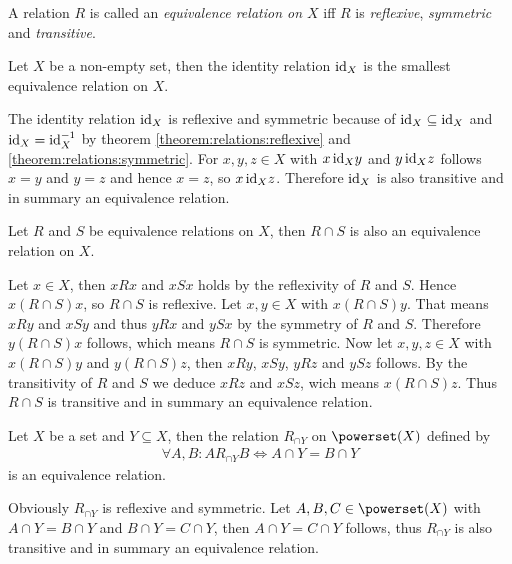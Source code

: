 \begin{definition}
    A relation $R$ is called an \emph{equivalence relation on $X$} iff $R$ is \emph{reflexive}, \emph{symmetric} and \emph{transitive}.
\end{definition}

\begin{examples}
    \begin{exampleenumerate}
        \item\label{example:relations:identity_relation_equivalence_relation} Let $X$ be a non-empty set, then the identity relation $\text{id}_X$ is the smallest equivalence relation on $X$.
        \begin{miniproof}
            The identity relation $\text{id}_X$ is reflexive and symmetric because of $\text{id}_X\subseteq\text{id}_X$ and $\text{id}_X=\text{id}_X^{-1}$ by theorem \ref{theorem:relations:reflexive} and \ref{theorem:relations:symmetric}. For $x,y,z\in X$ with $x\,\text{id}_X y$ and $y\,\text{id}_X z$ follows $x=y$ and $y=z$ and hence $x=z$, so $x\,\text{id}_X z$. Therefore $\text{id}_X$ is also transitive and in summary an equivalence relation.
        \end{miniproof}
        \item Let $R$ and $S$ be equivalence relations on $X$, then $R\cap S$ is also an equivalence relation on $X$.
        \begin{miniproof}
            Let $x\in X$, then $x R x$ and $x S x$ holds by the reflexivity of $R$ and $S$. Hence $x (R\cap S) x$, so $R\cap S$ is reflexive. Let $x,y\in X$ with $x (R\cap S) y$. That means $x R y$ and $x S y$ and thus $y R x$ and $y S x$ by the symmetry of $R$ and $S$. Therefore $y (R\cap S) x$ follows, which means $R\cap S$ is symmetric. Now let $x,y,z\in X$ with $x(R\cap S)y$ and $y(R\cap S)z$, then $x R y$, $x S y$, $y R z$ and $y S z$ follows. By the transitivity of $R$ and $S$ we deduce $x R z$ and $x S z$, wich means $x(R\cap S)z$. Thus $R\cap S$ is transitive and in summary an equivalence relation.
        \end{miniproof}
        \item\label{example:relations:intersection_relation} Let $X$ be a set and $Y\subseteq X$, then the relation $R_{\cap Y}$ on $\powerset(X)$ defined by \begin{align}\forall A,B\colon A R_{\cap Y} B\iff A\cap Y=B\cap Y\end{align}
        is an equivalence relation.
        \begin{miniproof}
            Obviously $R_{\cap Y}$ is reflexive and symmetric. Let $A,B,C\in\powerset(X)$ with $A\cap Y=B\cap Y$ and $B\cap Y=C\cap Y$, then $A\cap Y=C\cap Y$ follows, thus $R_{\cap Y}$ is also transitive and in summary an equivalence relation.

\end{miniproof}
\end{exampleenumerate}
\end{examples}
